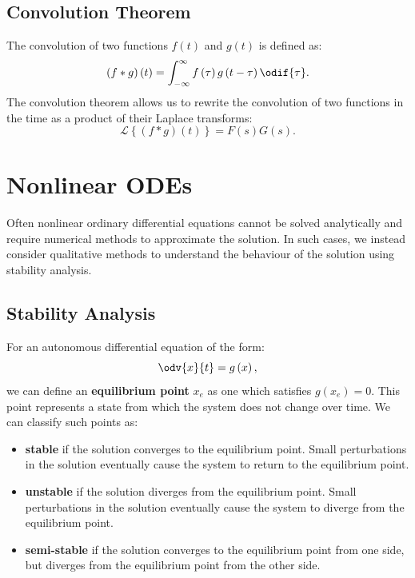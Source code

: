 \documentclass{article}
\begin{document}
\subsection{Convolution Theorem}
The convolution of two functions \(f\left( t \right)\) and \(g\left( t
\right)\) is defined as:
\begin{equation*}
    \left( f * g \right)\left( t \right) = \int_{-\infty}^\infty f\left( \tau \right) g\left( t - \tau \right) \odif{\tau}.
\end{equation*}
The convolution theorem allows us to rewrite the convolution of two
functions in the time as a product of their Laplace transforms:
\begin{equation*}
    \mathscr{L}\left\{ \left( f * g \right)\left( t \right) \right\} = F\left( s \right) G\left( s \right).
\end{equation*}
\section{Nonlinear ODEs}
Often nonlinear ordinary differential equations cannot be solved
analytically and require numerical methods to approximate the solution.
In such cases, we instead consider qualitative methods to understand
the behaviour of the solution using stability analysis.
\subsection{Stability Analysis}
For an autonomous differential equation of the form:
\begin{equation*}
    \odv{x}{t} = g\left( x \right),
\end{equation*}
we can define an \textbf{equilibrium point} \(x_e\) as one which
satisfies \(g\left( x_e \right) = 0\). This point represents a
state from which the system does not change over time. We can classify
such points as:
\begin{itemize}
    \item \textbf{stable} if the solution converges to the equilibrium
          point. Small perturbations in the solution eventually
          cause the system to return to the equilibrium point.
    \item \textbf{unstable} if the solution diverges from the
          equilibrium point. Small perturbations in the solution
          eventually cause the system to diverge from the
          equilibrium point.
    \item \textbf{semi-stable} if the solution converges to the
          equilibrium point from one side, but diverges from the
          equilibrium point from the other side.
\end{itemize}
\end{document}
